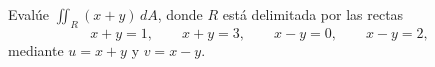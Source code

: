 Evalúe $\iint_R(x+y)\,dA$, donde $R$ está delimitada por las rectas
\[
x+y=1,\qquad x+y=3,\qquad x-y=0,\qquad x-y=2,
\]
mediante $u=x+y$ y $v=x-y$.
